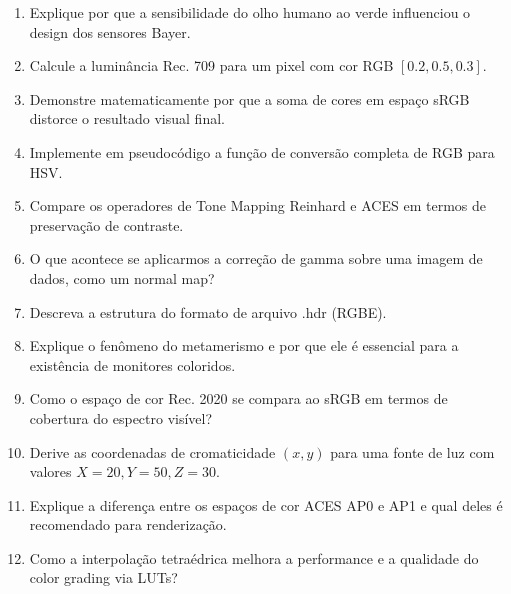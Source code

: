\begin{enumerate}
    \item Explique por que a sensibilidade do olho humano ao verde influenciou o design dos sensores Bayer.
    \item Calcule a luminância Rec. 709 para um pixel com cor RGB $[0.2, 0.5, 0.3]$.
    \item Demonstre matematicamente por que a soma de cores em espaço sRGB distorce o resultado visual final.
    \item Implemente em pseudocódigo a função de conversão completa de RGB para HSV.
    \item Compare os operadores de Tone Mapping Reinhard e ACES em termos de preservação de contraste.
    \item O que acontece se aplicarmos a correção de gamma sobre uma imagem de dados, como um normal map?
    \item Descreva a estrutura do formato de arquivo .hdr (RGBE).
    \item Explique o fenômeno do metamerismo e por que ele é essencial para a existência de monitores coloridos.
    \item Como o espaço de cor Rec. 2020 se compara ao sRGB em termos de cobertura do espectro visível?
    \item Derive as coordenadas de cromaticidade $(x, y)$ para uma fonte de luz com valores $X=20, Y=50, Z=30$.
    \item Explique a diferença entre os espaços de cor ACES AP0 e AP1 e qual deles é recomendado para renderização.
    \item Como a interpolação tetraédrica melhora a performance e a qualidade do color grading via LUTs?
\end{enumerate}

\textcite{shirley2021fundamentals}
\textcite{akenine2018realtime}
\textcite{pharr2016pbr}
\textcite{reinhard2010high}
\textcite{hable2010filmic}
\textcite{poynton2012digital}
\textcite{wyszecki1982color}
\textcite{stokes1996standard}


